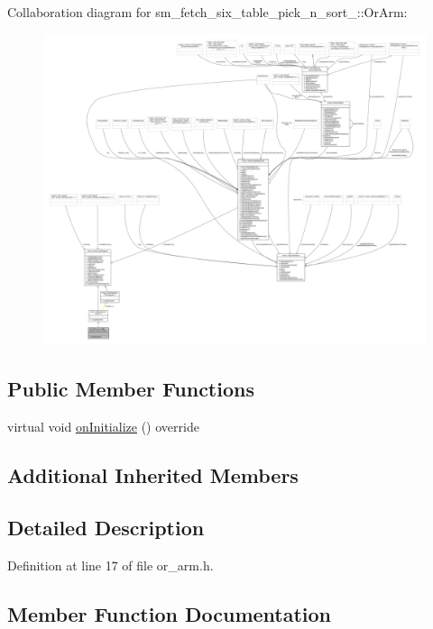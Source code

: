 Collaboration diagram for sm\+\_\+fetch\+\_\+six\+\_\+table\+\_\+pick\+\_\+n\+\_\+sort\+\_\+:\+:Or\+Arm\+:
\nopagebreak
\begin{figure}[H]
\begin{center}
\leavevmode
\includegraphics[width=350pt]{classsm__fetch__six__table__pick__n__sort__1_1_1OrArm__coll__graph}
\end{center}
\end{figure}
\subsection*{Public Member Functions}
\begin{DoxyCompactItemize}
\item 
virtual void \hyperlink{classsm__fetch__six__table__pick__n__sort__1_1_1OrArm_a0cce02f6b7599e602310347cad5c3729}{on\+Initialize} () override
\end{DoxyCompactItemize}
\subsection*{Additional Inherited Members}


\subsection{Detailed Description}


Definition at line 17 of file or\+\_\+arm.\+h.



\subsection{Member Function Documentation}
\mbox{\label{classsm__fetch__six__table__pick__n__sort__1_1_1OrArm_a0cce02f6b7599e602310347cad5c3729}} 
